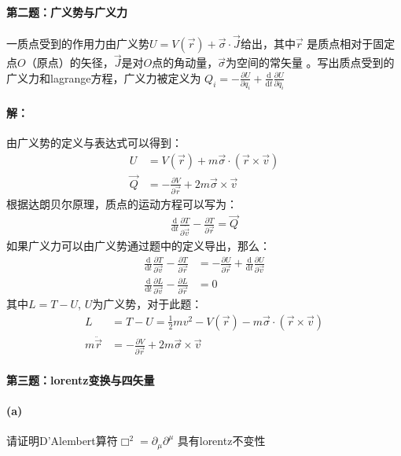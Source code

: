 \documentclass[a4paper]{ctexart}
\def\d{\mathrm{d}}
\begin{document}
    \paragraph{第二题：广义势与广义力}
    一质点受到的作用力由广义势$U = V(\vec{r}) + \vec{\sigma}\cdot\vec{J}$给出，其中$\vec{r}$
    是质点相对于固定点$O$（原点）的矢径，$\vec{J}$是对$O$点的角动量，$\vec{\sigma}$为空间的常矢量
    。写出质点受到的广义力和lagrange方程，广义力被定义为
    $Q_{i} = -\frac{\partial U}{\partial q_{i}} + \frac{\d }{\d t}\frac{\partial U}{\partial \dot{q_{i}}}$
    \paragraph{解：}
    由广义势的定义与表达式可以得到：
    \begin{align}
        U &= V(\vec{r}) + m\vec{\sigma}\cdot(\vec{r}\times\vec{v})\\
        \vec{Q} &= -\frac{\partial V}{\partial \vec{r}} + 2m\vec{\sigma}\times\vec{v}
    \end{align}
    根据达朗贝尔原理，质点的运动方程可以写为：
    \begin{align}
        \frac{\d }{\d t}\frac{\partial T}{\partial \dot{\vec{v}}} - \frac{\partial T}{\partial \vec{r}} = \vec{Q}
    \end{align}
    如果广义力可以由广义势通过题中的定义导出，那么：
    \begin{align}
        \frac{\d }{\d t}\frac{\partial T}{\partial \vec{v}} - \frac{\partial T}{\partial \vec{r}} &= -\frac{\partial U}{\partial \vec{r}} + \frac{\d }{\d t}\frac{\partial U}{\partial \vec{v}}\\
        \frac{\d }{\d t}\frac{\partial L}{\partial \vec{v}} - \frac{\partial L}{\partial \vec{r}} &= 0
    \end{align}
    其中$L = T - U$, $U$为广义势，对于此题：
    \begin{align}
        L &= T - U = \frac{1}{2}mv^{2} - V(\vec{r}) - m\vec{\sigma}\cdot(\vec{r}\times\vec{v})\\
        m\ddot{\vec{r}} &= -\frac{\partial V}{\partial \vec{r}} + 2m\vec{\sigma}\times\vec{v}
    \end{align}

    \paragraph{第三题：lorentz变换与四矢量}
    \paragraph{(a)} 请证明D'Alembert算符$\Box^{2} = \partial_{\mu}\partial^{\mu}$
    具有lorentz不变性
\end{document}
